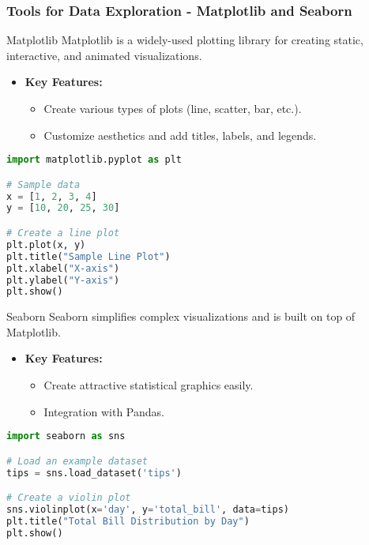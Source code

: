 \documentclass[aspectratio=169]{beamer}
\begin{document}
\begin{frame}[fragile]
  \frametitle{Tools for Data Exploration - Matplotlib and Seaborn}
  \begin{block}{Matplotlib}
    Matplotlib is a widely-used plotting library for creating static, interactive, and animated visualizations.
  \end{block}
  \begin{itemize}
    \item \textbf{Key Features:}
    \begin{itemize}
      \item Create various types of plots (line, scatter, bar, etc.).
      \item Customize aesthetics and add titles, labels, and legends.
    \end{itemize}
  \end{itemize}

  \begin{lstlisting}[language=Python]
import matplotlib.pyplot as plt

# Sample data
x = [1, 2, 3, 4]
y = [10, 20, 25, 30]

# Create a line plot
plt.plot(x, y)
plt.title("Sample Line Plot")
plt.xlabel("X-axis")
plt.ylabel("Y-axis")
plt.show()
  \end{lstlisting}

  \begin{block}{Seaborn}
    Seaborn simplifies complex visualizations and is built on top of Matplotlib.
  \end{block}
  \begin{itemize}
    \item \textbf{Key Features:}
    \begin{itemize}
      \item Create attractive statistical graphics easily.
      \item Integration with Pandas.
    \end{itemize}
  \end{itemize}

  \begin{lstlisting}[language=Python]
import seaborn as sns

# Load an example dataset
tips = sns.load_dataset('tips')

# Create a violin plot
sns.violinplot(x='day', y='total_bill', data=tips)
plt.title("Total Bill Distribution by Day")
plt.show()
  \end{lstlisting}
\end{frame}
\end{document}
